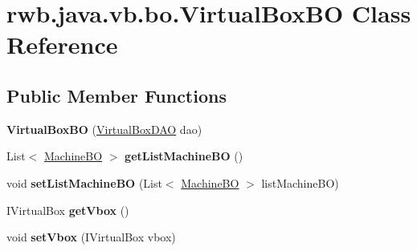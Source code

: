 \hypertarget{classrwb_1_1java_1_1vb_1_1bo_1_1_virtual_box_b_o}{}\section{rwb.\+java.\+vb.\+bo.\+Virtual\+Box\+BO Class Reference}
\label{classrwb_1_1java_1_1vb_1_1bo_1_1_virtual_box_b_o}
\subsection*{Public Member Functions}
\begin{DoxyCompactItemize}
\item 
\mbox{\label{classrwb_1_1java_1_1vb_1_1bo_1_1_virtual_box_b_o_a72634c62038a6420d25c56cb3507d204}} 
{\bfseries Virtual\+Box\+BO} (\hyperlink{classrwb_1_1java_1_1vb_1_1dao_1_1_virtual_box_d_a_o}{Virtual\+Box\+D\+AO} dao)
\item 
\mbox{\label{classrwb_1_1java_1_1vb_1_1bo_1_1_virtual_box_b_o_a9bfefe259cce3aad9bdbfee90b58189b}} 
List$<$ \hyperlink{classrwb_1_1java_1_1vb_1_1bo_1_1_machine_b_o}{Machine\+BO} $>$ {\bfseries get\+List\+Machine\+BO} ()
\item 
\mbox{\label{classrwb_1_1java_1_1vb_1_1bo_1_1_virtual_box_b_o_a1011cfbc99d9cc78fb666af195e65260}} 
void {\bfseries set\+List\+Machine\+BO} (List$<$ \hyperlink{classrwb_1_1java_1_1vb_1_1bo_1_1_machine_b_o}{Machine\+BO} $>$ list\+Machine\+BO)
\item 
\mbox{\label{classrwb_1_1java_1_1vb_1_1bo_1_1_virtual_box_b_o_a5bfd12a185a4ff5755453dc096c9ae44}} 
I\+Virtual\+Box {\bfseries get\+Vbox} ()
\item 
\mbox{\label{classrwb_1_1java_1_1vb_1_1bo_1_1_virtual_box_b_o_a387b7f740083cdfb742d78971af644e6}} 
void {\bfseries set\+Vbox} (I\+Virtual\+Box vbox)
\item 
\mbox{\label{classrwb_1_1java_1_1vb_1_1bo_1_1_virtual_box_b_o_a11a72b6c8117b0ad646732233386cbcf}} 

\end{DoxyCompactItemize}
